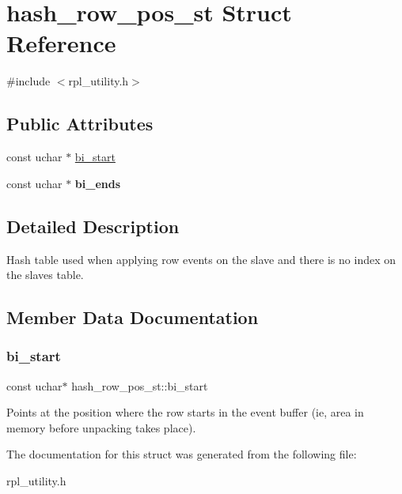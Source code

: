 \hypertarget{structhash__row__pos__st}{}\section{hash\+\_\+row\+\_\+pos\+\_\+st Struct Reference}
\label{structhash__row__pos__st}


{\ttfamily \#include $<$rpl\+\_\+utility.\+h$>$}

\subsection*{Public Attributes}
\begin{DoxyCompactItemize}
\item 
const uchar $\ast$ \mbox{\hyperlink{structhash__row__pos__st_a3d4819e57201c7b1ede4322166e2c2ae}{bi\+\_\+start}}
\item 
\mbox{\label{structhash__row__pos__st_ab407acc9cc9bc77e1edb56d11886b6d8}} 
const uchar $\ast$ {\bfseries bi\+\_\+ends}
\end{DoxyCompactItemize}


\subsection{Detailed Description}
Hash table used when applying row events on the slave and there is no index on the slave\textquotesingle{}s table. 

\subsection{Member Data Documentation}
\mbox{\label{structhash__row__pos__st_a3d4819e57201c7b1ede4322166e2c2ae}} 
\subsubsection{\texorpdfstring{bi\+\_\+start}{bi\_start}}
{\footnotesize\ttfamily const uchar$\ast$ hash\+\_\+row\+\_\+pos\+\_\+st\+::bi\+\_\+start}

Points at the position where the row starts in the event buffer (ie, area in memory before unpacking takes place). 

The documentation for this struct was generated from the following file\+:\begin{DoxyCompactItemize}
\item 
rpl\+\_\+utility.\+h\end{DoxyCompactItemize}
